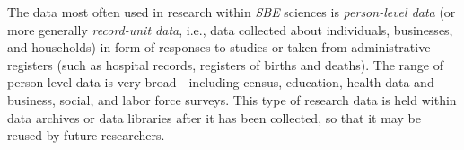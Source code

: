 \documentclass[conference]{IEEEtran}
\begin{document}

The data most often used in research within \emph{SBE} sciences is \emph{person-level data} (or more generally \emph{record-unit data}, i.e., data collected about individuals, businesses, and households) in form of responses to studies or taken from administrative registers
(such as hospital records, registers of births and deaths). 
The range of person-level data is very broad - 
including census, education, health data and business, social, and labor force surveys.  
This type of research data is
held within data archives or data libraries after it has been collected, so that it may be
reused by future researchers. 
\end{document}
